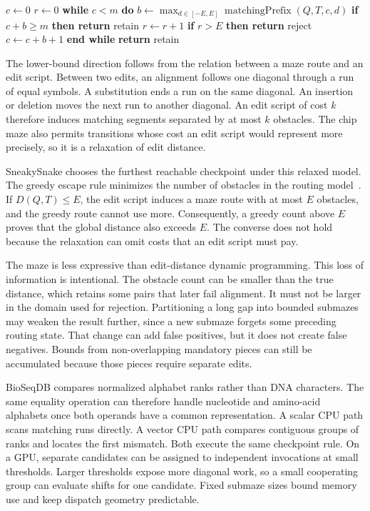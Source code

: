 \begin{algorithm}[H]
\caption{Unpartitioned SneakySnake core for one equal-length submaze}
\label{alg:prefilter-sneakysnake}
\small
\begin{algorithmic}[1]
\State \(c\gets0\)
\State \(r\gets0\)
\State \textbf{while} \(c<m\) \textbf{do}
    \State \(b\gets\max_{d\in[-E,E]}
        \operatorname{matchingPrefix}(Q,T,c,d)\)
    \State \textbf{if} \(c+b\geq m\) \textbf{then return} retain
    \State \(r\gets r+1\)
    \State \textbf{if} \(r>E\) \textbf{then return} reject
    \State \(c\gets c+b+1\)
\State \textbf{end while}
\State \textbf{return} retain
\end{algorithmic}
\end{algorithm}

The lower-bound direction follows from the relation between a maze route and
an edit script. Between two edits, an alignment follows one diagonal through a
run of equal symbols. A substitution ends a run on the same diagonal. An
insertion or deletion moves the next run to another diagonal. An edit script
of cost \(k\) therefore induces matching segments separated by at most \(k\)
obstacles. The chip maze also permits transitions whose cost an edit script
would represent more precisely, so it is a relaxation of edit distance.

SneakySnake chooses the furthest reachable checkpoint under this relaxed
model. The greedy escape rule minimizes the number of obstacles in the routing
model~\cite{sneakysnake_paper}. If \(D(Q,T)\leq E\), the edit script induces a
maze route with at most \(E\) obstacles, and the greedy route cannot use more.
Consequently, a greedy count above \(E\) proves that the global distance also
exceeds \(E\). The converse does not hold because the relaxation can omit
costs that an edit script must pay.

The maze is less expressive than edit-distance dynamic programming. This loss
of information is intentional. The obstacle count can be smaller than the
true distance, which retains some pairs that later fail alignment. It must not
be larger in the domain used for rejection. Partitioning a long gap into
bounded submazes may weaken the result further, since a new submaze forgets
some preceding routing state. That change can add false positives, but it does
not create false negatives. Bounds from non-overlapping mandatory pieces can
still be accumulated because those pieces require separate edits.

BioSeqDB compares normalized alphabet ranks rather than DNA characters. The
same equality operation can therefore handle nucleotide and amino-acid
alphabets once both operands have a common representation. A scalar CPU path
scans matching runs directly. A vector CPU path compares contiguous groups of
ranks and locates the first mismatch. Both execute the same checkpoint rule.
On a GPU, separate candidates can be assigned to independent invocations at
small thresholds. Larger thresholds expose more diagonal work, so a small
cooperating group can evaluate shifts for one candidate. Fixed submaze sizes
bound memory use and keep dispatch geometry predictable.


